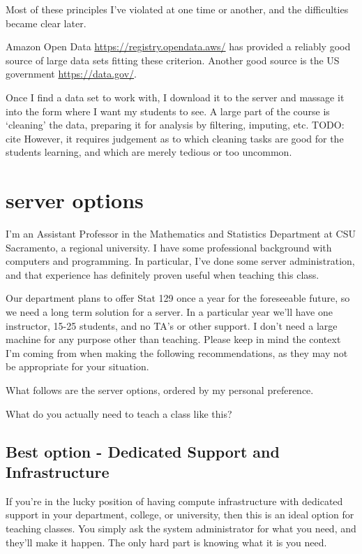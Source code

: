 \documentclass[12pt]{article}
\begin{document}
Most of these principles I've violated at one time or another, and the difficulties became clear later.

Amazon Open Data \url{https://registry.opendata.aws/} has provided a reliably good source of large data sets fitting these criterion. 
Another good source is the US government \url{https://data.gov/}.

Once I find a data set to work with, I download it to the server and massage it into the form where I want my students to see.
A large part of the course is `cleaning' the data, preparing it for analysis by filtering, imputing, etc.
TODO: cite
However, it requires judgement as to which cleaning tasks are good for the students learning, and which are merely tedious or too uncommon.


\section{server options}

I'm an Assistant Professor in the Mathematics and Statistics Department at CSU Sacramento, a regional university.
I have some professional background with computers and programming.
In particular, I've done some server administration, and that experience has definitely proven useful when teaching this class.

Our department plans to offer Stat 129 once a year for the foreseeable future, so we need a long term solution for a server.
In a particular year we'll have one instructor, 15-25 students, and no TA's or other support.
I don't need a large machine for any purpose other than teaching.
Please keep in mind the context I'm coming from when making the following recommendations, as they may not be appropriate for your situation.

What follows are the server options, ordered by my personal preference.

What do you actually need to teach a class like this?

\subsection{Best option - Dedicated Support and Infrastructure}

If you're in the lucky position of having compute infrastructure with dedicated support in your department, college, or university, then this is an ideal option for teaching classes.
You simply ask the system administrator for what you need, and they'll make it happen.
The only hard part is knowing what it is you need.
\end{document}
